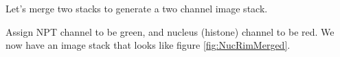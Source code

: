 Let's merge two stacks to generate a two channel image stack.


Assign NPT channel to be green, and nucleus (histone) channel to be red. We now have an image stack that looks like figure \ref{fig:NucRimMerged}.
